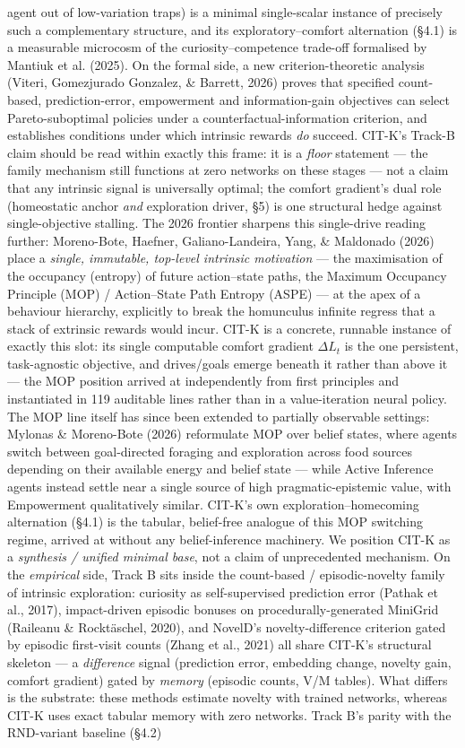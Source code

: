 \documentclass[11pt]{article}
\begin{document}
agent out of low-variation traps) is a minimal single-scalar instance of precisely such a complementary structure, and its exploratory–comfort alternation (§4.1) is a measurable microcosm of the curiosity–competence trade-off formalised by Mantiuk et al. (2025). On the formal side, a new criterion-theoretic analysis (Viteri, Gomezjurado Gonzalez, \& Barrett, 2026) proves that specified count-based, prediction-error, empowerment and information-gain objectives can select Pareto-suboptimal policies under a counterfactual-information criterion, and establishes conditions under which intrinsic rewards \emph{do} succeed. CIT-K's Track-B claim should be read within exactly this frame: it is a \emph{floor} statement — the family mechanism still functions at zero networks on these stages — not a claim that any intrinsic signal is universally optimal; the comfort gradient's dual role (homeostatic anchor \emph{and} exploration driver, §5) is one structural hedge against single-objective stalling. The 2026 frontier sharpens this single-drive reading further: Moreno-Bote, Haefner, Galiano-Landeira, Yang, \& Maldonado (2026) place a \emph{single, immutable, top-level intrinsic motivation} — the maximisation of the occupancy (entropy) of future action–state paths, the Maximum Occupancy Principle (MOP) / Action–State Path Entropy (ASPE) — at the apex of a behaviour hierarchy, explicitly to break the homunculus infinite regress that a stack of extrinsic rewards would incur. CIT-K is a concrete, runnable instance of exactly this slot: its single computable comfort gradient $\Delta L_t$ is the one persistent, task-agnostic objective, and drives/goals emerge beneath it rather than above it — the MOP position arrived at independently from first principles and instantiated in 119 auditable lines rather than in a value-iteration neural policy. The MOP line itself has since been extended to partially observable settings: Mylonas \& Moreno-Bote (2026) reformulate MOP over belief states, where agents switch between goal-directed foraging and exploration across food sources depending on their available energy and belief state — while Active Inference agents instead settle near a single source of high pragmatic-epistemic value, with Empowerment qualitatively similar. CIT-K's own exploration–homecoming alternation (§4.1) is the tabular, belief-free analogue of this MOP switching regime, arrived at without any belief-inference machinery. We position CIT-K as a \emph{synthesis / unified minimal base}, not a claim of unprecedented mechanism. On the \emph{empirical} side, Track B sits inside the count-based / episodic-novelty family of intrinsic exploration: curiosity as self-supervised prediction error (Pathak et al., 2017), impact-driven episodic bonuses on procedurally-generated MiniGrid (Raileanu \& Rocktäschel, 2020), and NovelD's novelty-difference criterion gated by episodic first-visit counts (Zhang et al., 2021) all share CIT-K's structural skeleton — a \emph{difference} signal (prediction error, embedding change, novelty gain, comfort gradient) gated by \emph{memory} (episodic counts, V/M tables). What differs is the substrate: these methods estimate novelty with trained networks, whereas CIT-K uses exact tabular memory with zero networks. Track B's parity with the RND-variant baseline (§4.2) 
\end{document}
